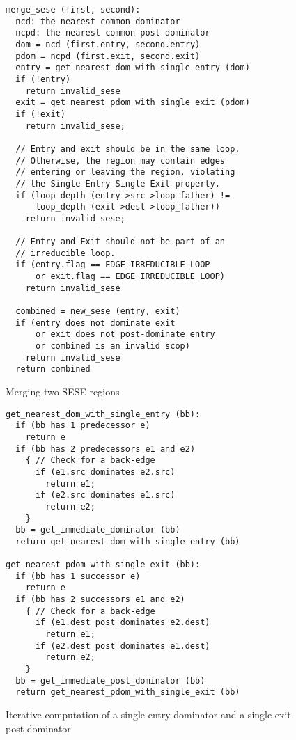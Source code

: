 \documentclass{sigplanconf}
\begin{document}
\begin{figure}
\begin{verbatim}
merge_sese (first, second):
  ncd: the nearest common dominator
  ncpd: the nearest common post-dominator
  dom = ncd (first.entry, second.entry)
  pdom = ncpd (first.exit, second.exit)
  entry = get_nearest_dom_with_single_entry (dom)
  if (!entry)
    return invalid_sese
  exit = get_nearest_pdom_with_single_exit (pdom)
  if (!exit)
    return invalid_sese;

  // Entry and exit should be in the same loop.
  // Otherwise, the region may contain edges
  // entering or leaving the region, violating
  // the Single Entry Single Exit property.
  if (loop_depth (entry->src->loop_father) !=
      loop_depth (exit->dest->loop_father))
    return invalid_sese;

  // Entry and Exit should not be part of an
  // irreducible loop.
  if (entry.flag == EDGE_IRREDUCIBLE_LOOP
      or exit.flag == EDGE_IRREDUCIBLE_LOOP)
    return invalid_sese

  combined = new_sese (entry, exit)
  if (entry does not dominate exit
      or exit does not post-dominate entry
      or combined is an invalid scop)
    return invalid_sese
  return combined
\end{verbatim}
\caption{Merging two SESE regions}
\label{fig:merge-sese}
\end{figure}


\begin{figure}
\begin{verbatim}
get_nearest_dom_with_single_entry (bb):
  if (bb has 1 predecessor e)
    return e
  if (bb has 2 predecessors e1 and e2)
    { // Check for a back-edge
      if (e1.src dominates e2.src)
        return e1;
      if (e2.src dominates e1.src)
        return e2;
    }
  bb = get_immediate_dominator (bb)
  return get_nearest_dom_with_single_entry (bb)

get_nearest_pdom_with_single_exit (bb):
  if (bb has 1 successor e)
    return e
  if (bb has 2 successors e1 and e2)
    { // Check for a back-edge
      if (e1.dest post dominates e2.dest)
        return e1;
      if (e2.dest post dominates e1.dest)
        return e2;
    }
  bb = get_immediate_post_dominator (bb)
  return get_nearest_pdom_with_single_exit (bb)
\end{verbatim}
\caption{Iterative computation of a single entry dominator and a single exit
  post-dominator}
\label{fig:iterate-single-entry}
\end{figure}
\end{document}
